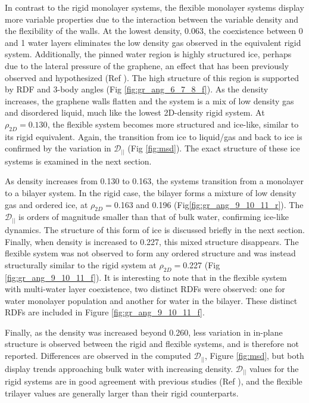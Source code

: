 \documentclass[12pt]{article}
\begin{document}
In contrast to the rigid monolayer systems, the flexible monolayer systems display more variable properties due to the interaction between the variable density and the flexibility of the walls. At the lowest density, 0.063, the coexistence between 0 and 1 water layers eliminates the low density gas observed in the equivalent rigid system. Additionally, the pinned water region is highly structured ice, perhaps due to the lateral pressure of the graphene, an effect that has been previously observed and hypothesized (Ref \cite{Algara-Siller2015}). The high structure of this region is supported by RDF and 3-body angles (Fig \ref{fig:gr_ang_6_7_8_f}). As the density increases, the graphene walls flatten and the system is a mix of low density gas and  disordered liquid, much like the lowest 2D-density rigid system. At \(\rho_{2D}=0.130\), the flexible system becomes more structured and ice-like, similar to its rigid equivalent. Again, the transition from ice to liquid/gas and back to ice is confirmed by the variation in \(\mathcal{D}_{||}\) (Fig \ref{fig:msd}). The exact structure of these ice systems is examined in the next section. 

As density increases from 0.130 to 0.163, the systems transition from a monolayer to a bilayer system. In the rigid case, the bilayer forms a mixture of low density gas and ordered ice, at \(\rho_{2D}=\)0.163 and 0.196 (Fig\ref{fig:gr_ang_9_10_11_r}). The \(\mathcal{D}_{||}\) is orders of magnitude smaller than that of bulk water, confirming ice-like dynamics. The structure of this form of ice is discussed briefly in the next section. Finally, when density is increased to 0.227, this mixed structure disappears. The flexible system was not observed to form any ordered structure and was instead structurally similar to the rigid system at \(\rho_{2D}=\)0.227 (Fig \ref{fig:gr_ang_9_10_11_f}). It is interesting to note that in the flexible system with multi-water layer coexistence, two distinct RDFs were observed: one for water monolayer population and another for water in the bilayer. These distinct RDFs are included in Figure \ref{fig:gr_ang_9_10_11_f}.

Finally, as the density was increased beyond 0.260, less variation in in-plane structure is observed between the rigid and flexible systems, and is therefore not reported. Differences are observed in the computed \(\mathcal{D}_{||}\), Figure \ref{fig:msd}, but both display trends approaching bulk water with increasing density. \(\mathcal{D}_{||}\) values for the rigid systems are in good agreement with previous studies (Ref \cite{Mosaddeghi2012}), and the flexible trilayer values are generally larger than their rigid counterparts. 
\end{document}
